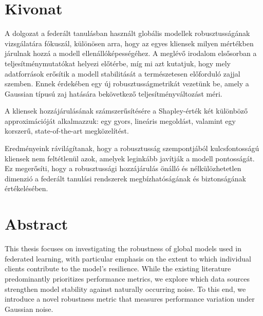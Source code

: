 \setcounter{page}{1}

\selecthungarian

\chapter*{Kivonat}

A dolgozat a federált tanulásban használt globális modellek robusztusságának vizsgálatára fókuszál, különösen arra, hogy az egyes kliensek milyen mértékben járulnak hozzá a modell ellenállóképességéhez. A meglévő irodalom elsősorban a teljesítménymutatókat helyezi előtérbe, míg mi azt kutatjuk, hogy mely adatforrások erősítik a modell stabilitását a természetesen előforduló zajjal szemben. Ennek érdekében egy új robusztusságmetrikát vezetünk be, amely a Gaussian típusú zaj hatására bekövetkező teljesítményváltozást méri.

A kliensek hozzájárulásának számszerűsítésére a Shapley-érték két különböző approximációját alkalmazzuk: egy gyors, lineáris megoldást, valamint egy korszerű, state-of-the-art megközelítést.

Eredményeink rávilágítanak, hogy a robusztusság szempontjából kulcsfontosságú kliensek nem feltétlenül azok, amelyek leginkább javítják a modell pontosságát. Ez megerősíti, hogy a robusztussági hozzájárulás önálló és nélkülözhetetlen dimenzió a federált tanulási rendszerek megbízhatóságának és biztonságának értékelésében. 


\vfill
\selectenglish


\chapter*{Abstract}

This thesis focuses on investigating the robustness of global models used in federated learning, with particular emphasis on the extent to which individual clients contribute to the model’s resilience. While the existing literature predominantly prioritizes performance metrics, we explore which data sources strengthen model stability against naturally occurring noise. To this end, we introduce a novel robustness metric that measures performance variation under Gaussian noise.

